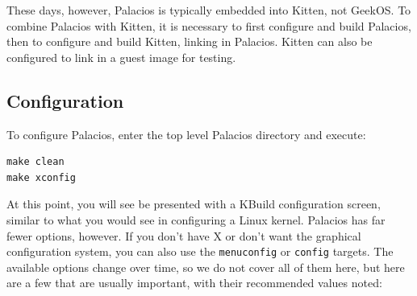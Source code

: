 \documentclass[11pt]{article}
\begin{document}
These days, however, Palacios is typically embedded into Kitten, not
GeekOS.  To combine Palacios with Kitten, it is necessary to first
configure and build Palacios, then to configure and build Kitten,
linking in Palacios.   Kitten can also be configured to link in a
guest image for testing.  

\subsection{Configuration}

To configure Palacios, enter the top level Palacios directory and
execute:
\begin{verbatim}
make clean
make xconfig
\end{verbatim}
At this point, you will see be presented with a KBuild configuration
screen, similar to what you would see in configuring a Linux kernel.
Palacios has far fewer options, however.   If you don't have X or
don't want the graphical configuration system, you can also use the
\verb.menuconfig. or \verb.config. targets.  The available options
change over time, so we do not cover all of them here, but here are a
few that are usually important, with their recommended values noted:
\end{document}

